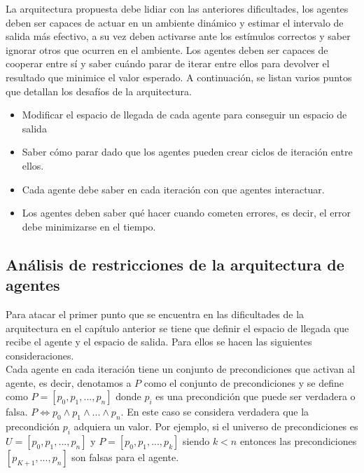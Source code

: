 \documentclass{article}
\begin{document}
        La arquitectura propuesta debe lidiar con las anteriores dificultades, los agentes deben ser capaces de actuar en un ambiente dinámico y estimar el intervalo de salida más efectivo, a su vez deben activarse ante los estímulos correctos y saber ignorar otros que ocurren en el ambiente. Los agentes deben ser capaces de cooperar entre sí y saber cuándo parar de iterar entre ellos para devolver el resultado que minimice el valor esperado. A continuación, se listan varios puntos que detallan los desafíos de la arquitectura.\\
        \begin{itemize}

            \item Modificar el espacio de llegada de cada agente para conseguir un espacio de salida
            \item Saber cómo parar dado que los agentes pueden crear ciclos de iteración entre ellos.
            \item Cada agente debe saber en cada iteración con que agentes interactuar.
            \item Los agentes deben saber qué hacer cuando cometen errores, es decir, el error debe minimizarse en el tiempo.\\

        \end{itemize}

\label{sec:15}

    \subsection*{ Análisis de restricciones de la arquitectura de agentes}

        Para atacar el primer punto que se encuentra en las dificultades de la arquitectura en el capítulo anterior se tiene que definir el espacio de llegada que recibe el agente y el espacio de salida. Para ellos se hacen las siguientes consideraciones.\\

        Cada agente en cada iteración tiene un conjunto de precondiciones que activan al agente, es decir, denotamos a $P$ como el conjunto de precondiciones y se define como $P=[ p_0,p_1,...,p_n]$ donde $p_i$ es una precondición que puede ser verdadera o falsa. $P \iff p_0 \land p_1 \land...\land p_n$. En este caso se considera verdadera que la precondición $p_i$ adquiera un valor. Por ejemplo, si el universo de precondiciones es $U=[p_0,p_1,...,p_n]$ y $P=[p_0,p_1,...,p_k]$ siendo $k<n$ entonces las precondiciones $[p_{K+1},...,p_n]$ son falsas para el agente. \\
\end{document}
